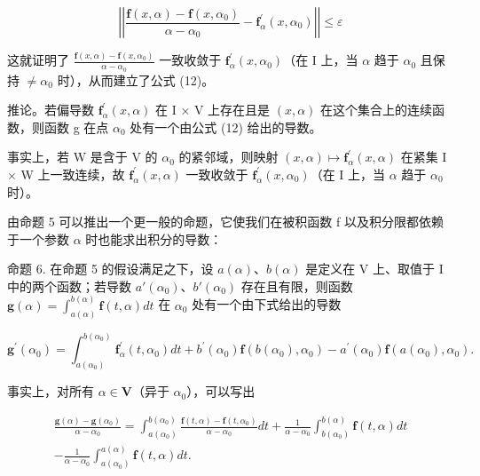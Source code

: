 \[
\left| \left| \frac {\mathbf {f} (x , \alpha) - \mathbf {f} (x , \alpha_ {0})}{\alpha - \alpha_ {0}} - \mathbf {f} _ {\alpha} ^ {\prime} (x, \alpha_ {0}) \right| \right| \leqslant \varepsilon
\]

这就证明了 \(\frac{\mathbf{f}(x,\alpha)-\mathbf{f}(x,\alpha_{0})}{\alpha-\alpha_{0}}\) 一致收敛于 \(\mathbf{f}_{\alpha}^{\prime}(x,\alpha_{0})\)（在 I 上，当 \(\alpha\) 趋于 \(\alpha_{0}\) 且保持 \(\neq\alpha_{0}\) 时），从而建立了公式 (12)。

推论。若偏导数 \(\mathbf{f}_{\alpha}^{\prime}(x,\alpha)\) 在 I × V 上存在且是 \((x,\alpha)\) 在这个集合上的连续函数，则函数 g 在点 \(\alpha_{0}\) 处有一个由公式 (12) 给出的导数。

事实上，若 W 是含于 V 的 \(\alpha_{0}\) 的紧邻域，则映射 \((x,\alpha)\mapsto\mathbf{f}_{\alpha}^{\prime}(x,\alpha)\) 在紧集 I × W 上一致连续，故 \(\mathbf{f}_{\alpha}^{\prime}(x,\alpha)\) 一致收敛于 \(\mathbf{f}_{\alpha}^{\prime}(x,\alpha_{0})\)（在 I 上，当 \(\alpha\) 趋于 \(\alpha_{0}\) 时）。

由命题 5 可以推出一个更一般的命题，它使我们在被积函数 f 以及积分限都依赖于一个参数 \(\alpha\) 时也能求出积分的导数：

命题 6. 在命题 5 的假设满足之下，设 \(a(\alpha)\)、\(b(\alpha)\) 是定义在 V 上、取值于 I 中的两个函数；若导数 \(a'(\alpha_0)\)、\(b'(\alpha_0)\) 存在且有限，则函数 \(\mathbf{g}(\alpha) = \int_{a(\alpha)}^{b(\alpha)} \mathbf{f}(t, \alpha) dt\) 在 \(\alpha_0\) 处有一个由下式给出的导数

\[
\mathbf {g} ^ {\prime} (\alpha_ {0}) = \int_ {a (\alpha_ {0})} ^ {b (\alpha_ {0})} \mathbf {f} _ {\alpha} ^ {\prime} (t, \alpha_ {0}) d t + b ^ {\prime} (\alpha_ {0}) \mathbf {f} (b (\alpha_ {0}), \alpha_ {0}) - a ^ {\prime} (\alpha_ {0}) \mathbf {f} (a (\alpha_ {0}), \alpha_ {0}).\tag{13}
\]

事实上，对所有 \(\alpha \in \mathbf{V}\)（异于 \(\alpha_0\)），可以写出

\[
\begin{array}{c} \frac {\mathbf {g} (\alpha) - \mathbf {g} (\alpha_ {0})}{\alpha - \alpha_ {0}} = \int_ {a (\alpha_ {0})} ^ {b (\alpha_ {0})} \frac {\mathbf {f} (t , \alpha) - \mathbf {f} (t , \alpha_ {0})}{\alpha - \alpha_ {0}} d t + \frac {1}{\alpha - \alpha_ {0}} \int_ {b (\alpha_ {0})} ^ {b (\alpha)} \mathbf {f} (t, \alpha) d t \\ - \frac {1}{\alpha - \alpha_ {0}} \int_ {a (\alpha_ {0})} ^ {a (\alpha)} \mathbf {f} (t, \alpha) d t. \end{array}
\]

